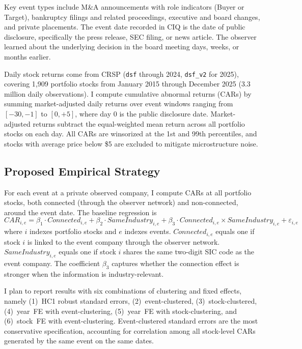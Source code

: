 Key event types include M\&A announcements with role indicators (Buyer or Target), bankruptcy filings and related proceedings, executive and board changes, and private placements. The event date recorded in CIQ is the date of public disclosure, specifically the press release, SEC filing, or news article. The observer learned about the underlying decision in the board meeting days, weeks, or months earlier.

Daily stock returns come from CRSP (\texttt{dsf} through 2024, \texttt{dsf\_v2} for 2025), covering 1,909 portfolio stocks from January 2015 through December 2025 (3.3 million daily observations). I compute cumulative abnormal returns (CARs) by summing market-adjusted daily returns over event windows ranging from $[-30,-1]$ to $[0,+5]$, where day 0 is the public disclosure date. Market-adjusted returns subtract the equal-weighted mean return across all portfolio stocks on each day. All CARs are winsorized at the 1st and 99th percentiles, and stocks with average price below \$5 are excluded to mitigate microstructure noise.

\subsection{Proposed Empirical Strategy}

For each event at a private observed company, I compute CARs at all portfolio stocks, both connected (through the observer network) and non-connected, around the event date. The baseline regression is
\begin{equation}
\label{eq:baseline}
CAR_{i,e} = \beta_1 \cdot Connected_{i,e} + \beta_2 \cdot SameIndustry_{i,e} + \beta_3 \cdot Connected_{i,e} \times SameIndustry_{i,e} + \varepsilon_{i,e}
\end{equation}
where $i$ indexes portfolio stocks and $e$ indexes events. $Connected_{i,e}$ equals one if stock $i$ is linked to the event company through the observer network. $SameIndustry_{i,e}$ equals one if stock $i$ shares the same two-digit SIC code as the event company. The coefficient $\beta_3$ captures whether the connection effect is stronger when the information is industry-relevant.

I plan to report results with six combinations of clustering and fixed effects, namely (1)~HC1 robust standard errors, (2)~event-clustered, (3)~stock-clustered, (4)~year~FE with event-clustering, (5)~year~FE with stock-clustering, and (6)~stock~FE with event-clustering. Event-clustered standard errors are the most conservative specification, accounting for correlation among all stock-level CARs generated by the same event on the same dates.

